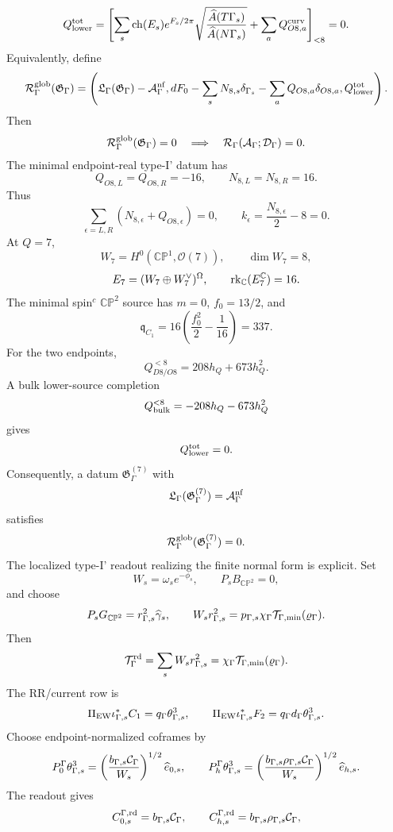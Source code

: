 \documentclass[11pt]{article}
\theoremstyle{definition}
\theoremstyle{remark}
\newcommand{\CP}{\mathbb{CP}}
\begin{document}
\[
  Q_{\rm lower}^{\rm tot}
  =
  \left[
  \sum_s{\rm ch}(E_s)e^{F_s/2\pi}
  \sqrt{\frac{\widehat A(T\Gamma_s)}
  {\widehat A(N\Gamma_s)}}
  +
  \sum_aQ_{O8,a}^{\rm curv}
  \right]_{<8}
  =
  0 .
\]
Equivalently, define
\[
  {\cal R}_\Gamma^{\rm glob}({\mathfrak G}_\Gamma)
  =
  \left(
  {\mathfrak L}_\Gamma({\mathfrak G}_\Gamma)-{\cal A}_\Gamma^{\rm nf},
  dF_0-\sum_sN_{8,s}\delta_{\Gamma_s}
  -\sum_aQ_{O8,a}\delta_{O8,a},
  Q_{\rm lower}^{\rm tot}
  \right).
\]
Then
\[
  {\cal R}_\Gamma^{\rm glob}({\mathfrak G}_\Gamma)=0
  \quad\Longrightarrow\quad
  {\cal R}_\Gamma({\cal A}_\Gamma;{\cal D}_\Gamma)=0 .
\]
The minimal endpoint-real type-I' datum has
\[
  Q_{O8,L}=Q_{O8,R}=-16,
  \qquad
  N_{8,L}=N_{8,R}=16.
\]
Thus
\[
  \sum_{\epsilon=L,R}(N_{8,\epsilon}+Q_{O8,\epsilon})=0,
  \qquad
  k_\epsilon=\frac{N_{8,\epsilon}}{2}-8=0.
\]
At \(Q=7\),
\[
  W_7=H^0(\CP^1,\mathcal O(7)),
  \qquad
  \dim W_7=8,
\]
\[
  E_7=(W_7\oplus W_7^\vee)^\Omega,
  \qquad
  {\rm rk}_{\mathbb C}(E_7^{\mathbb C})=16.
\]
The minimal spin\(^c\) \(\CP^2\) source has \(m=0\), \(f_0=13/2\), and
\[
  {\mathfrak q}_{C_1}
  =
  16\left(\frac{f_0^2}{2}-\frac1{16}\right)
  =
  337.
\]
For the two endpoints,
\[
  Q_{D8/O8}^{<8}
  =
  208h_Q+673h_Q^2.
\]
A bulk lower-source completion
\[
  Q_{\rm bulk}^{<8}
  =
  -208h_Q-673h_Q^2
\]
gives
\[
  Q_{\rm lower}^{\rm tot}=0.
\]
Consequently, a datum \({\mathfrak G}_\Gamma^{(7)}\) with
\[
  {\mathfrak L}_\Gamma({\mathfrak G}_\Gamma^{(7)})
  =
  {\cal A}_\Gamma^{\rm nf}
\]
satisfies
\[
  {\cal R}_\Gamma^{\rm glob}({\mathfrak G}_\Gamma^{(7)})=0.
\]
The localized type-I' readout realizing the finite normal form is explicit.
Set
\[
  W_s=\omega_s e^{-\phi_s},
  \qquad
  P_sB_{\CP^2}=0,
\]
and choose
\[
  P_sG_{\CP^2}
  =
  r_{\Gamma,s}^2\widehat\gamma_s,
  \qquad
  W_s r_{\Gamma,s}^2
  =
  p_{\Gamma,s}\chi_\Gamma
  {\cal T}_{\Gamma,\min}(\varrho_\Gamma).
\]
Then
\[
  {\cal T}_\Gamma^{\rm rd}
  =
  \sum_sW_s r_{\Gamma,s}^2
  =
  \chi_\Gamma{\cal T}_{\Gamma,\min}(\varrho_\Gamma).
\]
The RR/current row is
\[
  \Pi_{\rm EW}\iota_{\Gamma,s}^*C_1
  =
  q_\Gamma\theta_{\Gamma,s}^3,
  \qquad
  \Pi_{\rm EW}\iota_{\Gamma,s}^*F_2
  =
  q_\Gamma d_\Gamma\theta_{\Gamma,s}^3.
\]
Choose endpoint-normalized coframes by
\[
  P_0^\Gamma\theta_{\Gamma,s}^3
  =
  \left(\frac{b_{\Gamma,s}{\cal C}_\Gamma}{W_s}\right)^{1/2}
  \widehat e_{0,s},
  \qquad
  P_h^\Gamma\theta_{\Gamma,s}^3
  =
  \left(\frac{b_{\Gamma,s}\rho_{\Gamma,s}{\cal C}_\Gamma}{W_s}\right)^{1/2}
  \widehat e_{h,s}.
\]
The readout gives
\[
  C_{0,s}^{\Gamma,{\rm rd}}=b_{\Gamma,s}{\cal C}_\Gamma,
  \qquad
  C_{h,s}^{\Gamma,{\rm rd}}
  =
  b_{\Gamma,s}\rho_{\Gamma,s}{\cal C}_\Gamma,
\]
\end{document}
